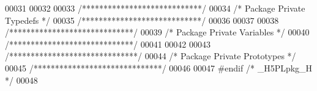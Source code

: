 \begin{DoxyCode}
00031 
00032 
00033 \textcolor{comment}{/****************************/}
00034 \textcolor{comment}{/* Package Private Typedefs */}
00035 \textcolor{comment}{/****************************/}
00036 
00037 
00038 \textcolor{comment}{/*****************************/}
00039 \textcolor{comment}{/* Package Private Variables */}
00040 \textcolor{comment}{/*****************************/}
00041 
00042 
00043 \textcolor{comment}{/******************************/}
00044 \textcolor{comment}{/* Package Private Prototypes */}
00045 \textcolor{comment}{/******************************/}
00046 
00047 \textcolor{preprocessor}{#endif }\textcolor{comment}{/* \_H5PLpkg\_H */}\textcolor{preprocessor}{}
00048 
\end{DoxyCode}
